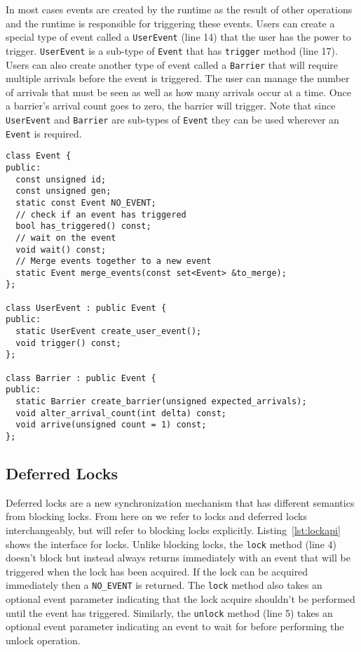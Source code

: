 In most cases events are created by the runtime as the result of other
operations and the runtime is responsible for triggering these events.  Users 
can create a special type of event called a {\tt UserEvent} (line 14) that the
user has the power to trigger.  {\tt UserEvent} is a sub-type of {\tt Event} 
that has {\tt trigger} method (line 17).  Users can also create another
type of event called a {\tt Barrier} that will require multiple arrivals before
the event is triggered.  The user can manage the number of arrivals that must
be seen as well as how many arrivals occur at a time.  Once a barrier's arrival
count goes to zero, the barrier will trigger.  Note that since {\tt UserEvent}
and {\tt Barrier} are sub-types of {\tt Event} they can be used wherever an
{\tt Event} is required.

\begin{lstlisting}[float={t},label={lst:eventapi},caption={Event Interface.}]
class Event {
public:
  const unsigned id;
  const unsigned gen;
  static const Event NO_EVENT;
  // check if an event has triggered
  bool has_triggered() const;
  // wait on the event
  void wait() const;
  // Merge events together to a new event
  static Event merge_events(const set<Event> &to_merge);
};

class UserEvent : public Event {
public:
  static UserEvent create_user_event();
  void trigger() const;
};

class Barrier : public Event {
public:
  static Barrier create_barrier(unsigned expected_arrivals);
  void alter_arrival_count(int delta) const;
  void arrive(unsigned count = 1) const;
};
\end{lstlisting}

\subsection{Deferred Locks}
\label{subsec:locks}
Deferred locks are a new synchronization mechanism that has different semantics from
blocking locks.  From here on we refer to locks and deferred locks interchangeably, 
but will refer to blocking locks explicitly.  Listing~\ref{lst:lockapi} shows the 
interface for locks.  Unlike blocking locks, the {\tt lock} method (line 4) doesn't
block but instead always returns immediately with an event that will be triggered
when the lock has been acquired.  If the lock can be acquired immediately then a {\tt NO\_EVENT}
is returned.  The {\tt lock} method also takes an optional event
parameter indicating that the lock acquire shouldn't be performed until the event
has triggered.  Similarly, the {\tt unlock} method (line 5) takes an optional event parameter indicating
an event to wait for before performing the unlock operation.

